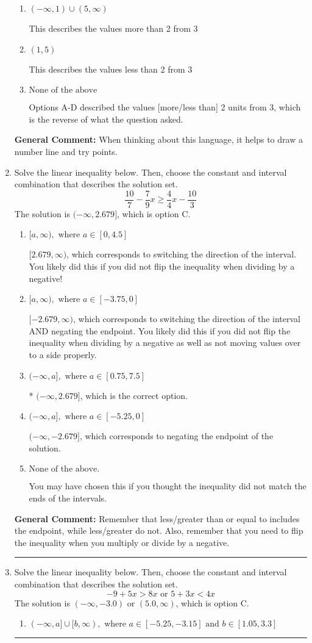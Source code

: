 \documentclass{extbook}[14pt]
\newcommand{\litem}[1]{\item #1

\rule{\textwidth}{0.4pt}}
\begin{document}
\begin{enumerate}
{\begin{enumerate}[label=\Alph*.]
This describes the values no more than 2 from 3
\item \( (-\infty, 1) \cup (5, \infty) \)

This describes the values more than 2 from 3
\item \( (1, 5) \)

This describes the values less than 2 from 3
\item \( \text{None of the above} \)

Options A-D described the values [more/less than] 2 units from 3, which is the reverse of what the question asked.
\end{enumerate}

\textbf{General Comment:} When thinking about this language, it helps to draw a number line and try points.
}
\litem{
Solve the linear inequality below. Then, choose the constant and interval combination that describes the solution set.
\[ \frac{10}{7} - \frac{7}{9} x \geq \frac{4}{4} x - \frac{10}{3} \]The solution is \( (-\infty, 2.679] \), which is option C.\begin{enumerate}[label=\Alph*.]
\item \( [a, \infty), \text{ where } a \in [0, 4.5] \)

 $[2.679, \infty)$, which corresponds to switching the direction of the interval. You likely did this if you did not flip the inequality when dividing by a negative!
\item \( [a, \infty), \text{ where } a \in [-3.75, 0] \)

 $[-2.679, \infty)$, which corresponds to switching the direction of the interval AND negating the endpoint. You likely did this if you did not flip the inequality when dividing by a negative as well as not moving values over to a side properly.
\item \( (-\infty, a], \text{ where } a \in [0.75, 7.5] \)

* $(-\infty, 2.679]$, which is the correct option.
\item \( (-\infty, a], \text{ where } a \in [-5.25, 0] \)

 $(-\infty, -2.679]$, which corresponds to negating the endpoint of the solution.
\item \( \text{None of the above}. \)

You may have chosen this if you thought the inequality did not match the ends of the intervals.
\end{enumerate}

\textbf{General Comment:} Remember that less/greater than or equal to includes the endpoint, while less/greater do not. Also, remember that you need to flip the inequality when you multiply or divide by a negative.
}
\litem{
Solve the linear inequality below. Then, choose the constant and interval combination that describes the solution set.
\[ -9 + 5 x > 8 x \text{ or } 5 + 3 x < 4 x \]The solution is \( (-\infty, -3.0) \text{ or } (5.0, \infty) \), which is option C.\begin{enumerate}[label=\Alph*.]
\item \( (-\infty, a] \cup [b, \infty), \text{ where } a \in [-5.25, -3.15] \text{ and } b \in [1.05, 3.3] \)


\end{enumerate}}
\end{enumerate}
\end{document}
